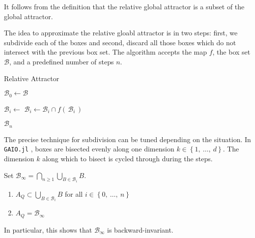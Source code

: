 \begin{remark}
    It follows from the definition that the relative global attractor is a subset of the 
    global attractor.\\
\end{remark}

The idea to approximate the relative gloabl attractor is in two steps: first, we subdivide 
each of the boxes and second, discard all those boxes which do not intersect with the 
previous box set. The algorithm accepts the map $f$, the box set $\mathcal{B}$, and a 
predefined number of steps $n$. 

\begin{algorithm}
    \caption{Relative Attractor}
    \label{alg:relativeattractor}
    \begin{algorithmic}[1]
        \State $\mathcal{B}_0 \gets \mathcal{B}$

            \State $\mathcal{B}_i \gets$ 
            \State $\mathcal{B}_i \gets \mathcal{B}_i \cap f (\,\mathcal{B}_i\,)$
        \EndFor

        \State \Return $\mathcal{B}_n$ 

    \end{algorithmic}
\end{algorithm}

\begin{remark}
    The precise technique for subdivision can be tuned depending on the situation. In 
    \texttt{GAIO.jl} \cite*{GAIO}, boxes are bisected evenly along one dimension 
    $k \in \left\{1,\ \dotsc,\ d\right\}$. The dimension $k$ along which to bisect is 
    cycled through during the steps. \\
\end{remark}

\begin{proposition}
    \cite*{algGAIO,subalg} Set 
    $\mathcal{B}_\infty = \bigcap\limits_{n \geq 1} \bigcup\limits_{B \in \mathcal{B}_i} B$.

    \begin{enumerate}
        \item $A_Q \subset \bigcup\limits_{B \in \mathcal{B}_i} B$ for all 
        $i \in \left\{ 0,\ \dotsc,\ n \right\}$
        \item $A_Q = \mathcal{B}_\infty$
    \end{enumerate}

    In particular, this shows that $\mathcal{B}_\infty$ is backward-invariant. 
\end{proposition}

